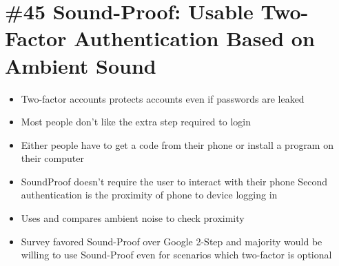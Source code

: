 \section{\#45 Sound-Proof: Usable Two-Factor Authentication Based on Ambient Sound}
\begin{itemize}
	\item Two-factor accounts protects accounts even if passwords are leaked
	\item Most people don't like the extra step required to login
	\item Either people have to get a code from their phone or install a program on their computer
	\item SoundProof doesn't require the user to interact with their phone
	\subitem Second authentication is the proximity of phone to device logging in
	\item Uses and compares ambient noise to check proximity
	\item Survey favored Sound-Proof over Google 2-Step and majority would be willing to use Sound-Proof even for scenarios which two-factor is optional
\end{itemize}